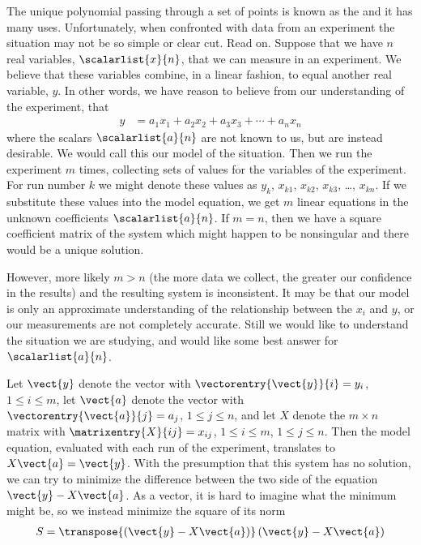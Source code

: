 %
The unique polynomial passing through a set of points is known as the  and it has many uses.  Unfortunately, when confronted with data from an experiment the situation may not be so simple or clear cut.  Read on.
%
%
Suppose that we have $n$ real variables, $\scalarlist{x}{n}$, that we can measure in an experiment.  We believe that these variables combine, in a linear fashion, to equal another real variable, $y$.  In other words, we have reason to believe from our understanding of the experiment, that
%
\begin{align*}
y&=a_1x_1+a_2x_2+a_3x_3+\cdots+a_nx_n
\end{align*}
%
where the scalars $\scalarlist{a}{n}$ are not known to us, but are instead desirable.  We would call this our model of the situation.  Then we run the experiment $m$ times, collecting sets of values for the variables of the experiment.  For run number $k$ we might denote these values as $y_k$, $x_{k1}$, $x_{k2}$, $x_{k3}$, \dots, $x_{kn}$.  If we substitute these values into the model equation, we get $m$ linear equations in the unknown coefficients $\scalarlist{a}{n}$.  If $m=n$, then we have a square coefficient matrix of the system which might happen to be nonsingular and there would be a unique solution.\par
%
However, more likely $m>n$ (the more data we collect, the greater our confidence in the results) and the resulting system is inconsistent.  It may be that our model is only an approximate understanding of the relationship between the $x_i$ and $y$, or our measurements are not completely accurate.  Still we would like to understand the situation we are studying, and would like some best answer for $\scalarlist{a}{n}$.\par
%
Let $\vect{y}$ denote the vector with $\vectorentry{\vect{y}}{i}=y_i$, $1\leq i\leq m$, let $\vect{a}$ denote the vector with $\vectorentry{\vect{a}}{j}=a_j$, $1\leq j\leq n$, and let $X$ denote the $m\times n$ matrix with $\matrixentry{X}{ij}=x_{ij}$, $1\leq i\leq m$, $1\leq j\leq n$.  Then the model equation, evaluated with each run of the experiment, translates to $X\vect{a}=\vect{y}$.  With the presumption that this system has no solution, we can try to minimize the difference between the two side of the equation $\vect{y}-X\vect{a}$.  As a vector, it is hard to imagine what the minimum might be, so we instead minimize the square of its norm
%
\begin{align*}
S=\transpose{\left(\vect{y}-X\vect{a}\right)}\left(\vect{y}-X\vect{a}\right)
\end{align*}
